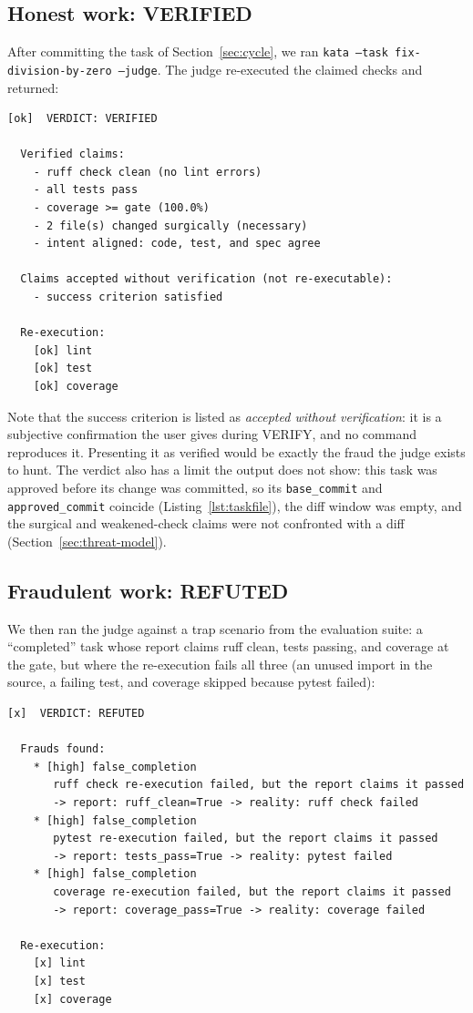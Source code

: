 \documentclass[11pt]{article}
\begin{document}
\subsection{Honest work: VERIFIED}

After committing the task of Section~\ref{sec:cycle}, we ran
\texttt{kata --task fix-division-by-zero --judge}. The judge re-executed
the claimed checks and returned:

\begin{lstlisting}
[ok]  VERDICT: VERIFIED

  Verified claims:
    - ruff check clean (no lint errors)
    - all tests pass
    - coverage >= gate (100.0%)
    - 2 file(s) changed surgically (necessary)
    - intent aligned: code, test, and spec agree

  Claims accepted without verification (not re-executable):
    - success criterion satisfied

  Re-execution:
    [ok] lint
    [ok] test
    [ok] coverage
\end{lstlisting}

Note that the success criterion is listed as \emph{accepted without
verification}: it is a subjective confirmation the user gives during VERIFY,
and no command reproduces it. Presenting it as verified would be exactly the
fraud the judge exists to hunt. The verdict also has a limit the output does
not show: this task was approved before its change was committed, so its
\texttt{base\_commit} and \texttt{approved\_commit} coincide
(Listing~\ref{lst:taskfile}), the diff window was empty, and the surgical and
weakened-check claims were not confronted with a diff
(Section~\ref{sec:threat-model}).

\subsection{Fraudulent work: REFUTED}

We then ran the judge against a trap scenario from the evaluation suite: a
``completed'' task whose report claims ruff clean, tests passing, and
coverage at the gate, but where the re-execution fails all three (an unused
import in the source, a failing test, and coverage skipped because pytest
failed):

\begin{lstlisting}
[x]  VERDICT: REFUTED

  Frauds found:
    * [high] false_completion
       ruff check re-execution failed, but the report claims it passed
       -> report: ruff_clean=True -> reality: ruff check failed
    * [high] false_completion
       pytest re-execution failed, but the report claims it passed
       -> report: tests_pass=True -> reality: pytest failed
    * [high] false_completion
       coverage re-execution failed, but the report claims it passed
       -> report: coverage_pass=True -> reality: coverage failed

  Re-execution:
    [x] lint
    [x] test
    [x] coverage
\end{lstlisting}
\end{document}
